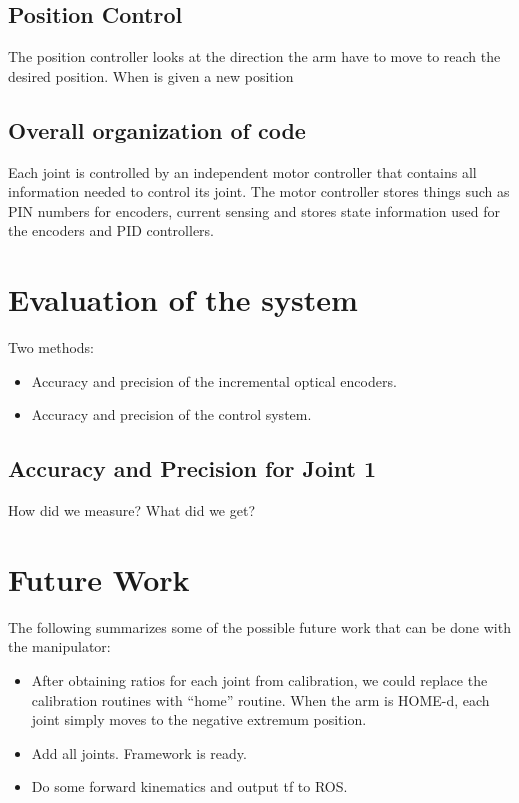 \documentclass[10pt,a4paper]{article}
\begin{document}
\subsection{Position Control}
The position controller looks at the direction the arm have to move to reach the desired position. When is given a new position 

\subsection{Overall organization of code}
Each joint is controlled by an independent motor controller that contains all information needed to control its joint. The motor controller stores things such as PIN numbers for encoders, current sensing and stores state information used for the encoders and PID controllers.


\section{Evaluation of the system}

Two methods:
\begin{itemize}
\item Accuracy and precision of the incremental optical encoders.
\item Accuracy and precision of the control system.
\end{itemize}

\subsection{Accuracy and Precision for Joint 1}
How did we measure?
What did we get?

\section{Future Work}

The following summarizes some of the possible future work that can be
done with the manipulator: 

\begin{itemize}
\item After obtaining ratios for each joint from calibration, we could
  replace the calibration routines with ``home'' routine. When the arm
  is HOME-d, each joint simply moves to the negative extremum
  position. 
\item Add all joints. Framework is ready.
\item Do some forward kinematics and output tf to ROS.
\end{itemize}



\end{document}
